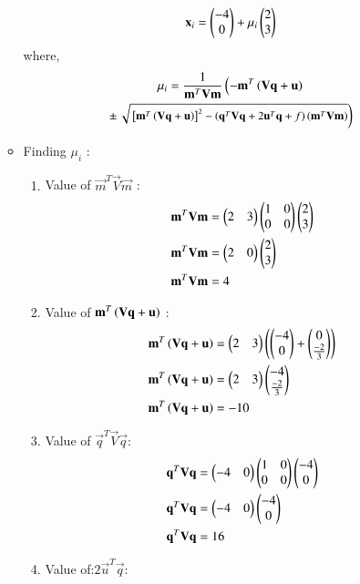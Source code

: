 \documentclass[journal,12pt,twocolumn]{IEEEtran}
\begin{document}
\begin{enumerate}
\begin{itemize}
\begin{align}
\mathbf{x}_i = \begin{pmatrix}-4\\0\end{pmatrix}+\mu_i\begin{pmatrix}2\\3\end{pmatrix}
\end{align}
%
where,
\begin{multline}
\mu_i = \frac{1}
{
\mathbf{m}^T\mathbf{V}\mathbf{m}
}
\left(-\mathbf{m}^T\left(\mathbf{V}\mathbf{q}+\mathbf{u}\right)\right.
\\
\pm
{\small
\ensuremath{\left.\sqrt{
{}\left[
\mathbf{m}^T\left(\mathbf{V}\mathbf{q}+\mathbf{u}\right)
\right]^2
-
\left(
\mathbf{q}^T\mathbf{V}\mathbf{q} + 2\mathbf{u}^T\mathbf{q} +f
\right)
\left(\mathbf{m}^T\mathbf{V}\mathbf{m}\right)
}
\right)}
}\label{eq:mu_i}
\end{multline}
\item Finding $\mu_i$ :
\begin{enumerate}[label=\alph*.]
\item Value of $\vec{m}^T\vec{V}\vec{m}$ :
\begin{align}
 \mathbf{m}^T\mathbf{V}\mathbf{m}&=\begin{pmatrix}2&3\end{pmatrix}\begin{pmatrix}1&0\\0&0\end{pmatrix}\begin{pmatrix}2\\3\end{pmatrix}
 \\
 \mathbf{m}^T\mathbf{V}\mathbf{m}&=\begin{pmatrix}2&0\end{pmatrix}\begin{pmatrix}2\\3\end{pmatrix}
 \\
\mathbf{m}^T\mathbf{V}\mathbf{m}&=4\label{eq:A}
\end{align}
\item Value of $
\mathbf{m}^T\left(\mathbf{V}\mathbf{q}+\mathbf{u}\right)$ :
\begin{align}
    \mathbf{m}^T\left(\mathbf{V}\mathbf{q}+\mathbf{u}\right)&=\begin{pmatrix}2&3\end{pmatrix}\left(\begin{pmatrix}-4\\0\end{pmatrix}+\begin{pmatrix}0\\\frac{-2}{3}\end{pmatrix}\right)
    \\
    \mathbf{m}^T\left(\mathbf{V}\mathbf{q}+\mathbf{u}\right)&=\begin{pmatrix}2&3\end{pmatrix}\begin{pmatrix}-4\\\frac{-2}{3}\end{pmatrix}
    \\
    \mathbf{m}^T\left(\mathbf{V}\mathbf{q}+\mathbf{u}\right)&=-10\label{eq:B}
\end{align}
\item Value of $\vec{q}^T\vec{V}\vec{q}$:
\begin{align}
   \mathbf{q}^T\mathbf{V}\mathbf{q}&= \begin{pmatrix}-4&0\end{pmatrix}\begin{pmatrix}1&0\\0&0\end{pmatrix}\begin{pmatrix}-4\\0\end{pmatrix}
   \\
   \mathbf{q}^T\mathbf{V}\mathbf{q}&= \begin{pmatrix}-4&0\end{pmatrix}\begin{pmatrix}-4\\0\end{pmatrix}
   \\
   \mathbf{q}^T\mathbf{V}\mathbf{q}&= 16\label{eq:C}
\end{align}
\item Value of:$2\vec{u}^T\vec{q}$:

\end{enumerate}
\end{itemize}
\end{enumerate}
\end{document}

